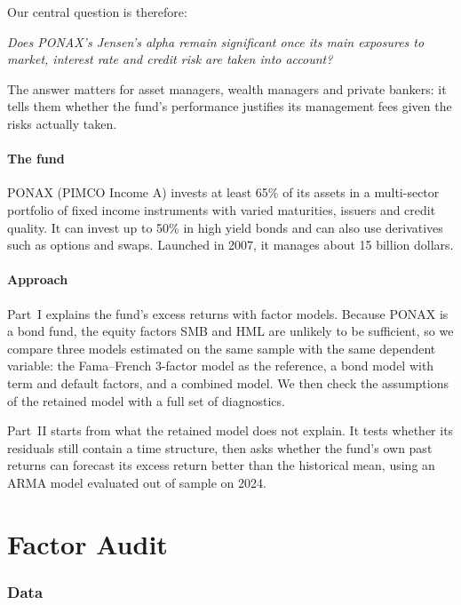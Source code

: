 \documentclass[11pt,a4paper]{article}
\begin{document}
Our central question is therefore:
\begin{center}
\emph{Does PONAX's Jensen's alpha remain significant once its main exposures to market, interest rate and credit risk are taken into account?}
\end{center}

The answer matters for asset managers, wealth managers and private bankers: it tells them whether the fund's performance justifies its management fees given the risks actually taken.

\subsection{The fund}

PONAX (PIMCO Income A) invests at least 65\% of its assets in a multi-sector portfolio of fixed income instruments with varied maturities, issuers and credit quality. It can invest up to 50\% in high yield bonds and can also use derivatives such as options and swaps. Launched in 2007, it manages about 15 billion dollars.

\subsection{Approach}

Part~I explains the fund's excess returns with factor models. Because PONAX is a bond fund, the equity factors SMB and HML are unlikely to be sufficient, so we compare three models estimated on the same sample with the same dependent variable: the Fama--French 3-factor model as the reference, a bond model with term and default factors, and a combined model. We then check the assumptions of the retained model with a full set of diagnostics.

Part~II starts from what the retained model does not explain. It tests whether its residuals still contain a time structure, then asks whether the fund's own past returns can forecast its excess return better than the historical mean, using an ARMA model evaluated out of sample on 2024.

\part{Factor Audit}

\section{Data}
\end{document}

